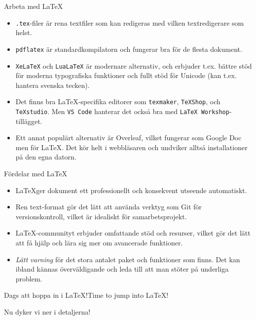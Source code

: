 \begin{Slide}{Arbeta med \LaTeX}\SlideFontSmall
  \begin{itemize}
    \item \texttt{.tex}-filer är rena textfiler som kan redigeras med vilken textredigerare som helst.
    \item \texttt{pdflatex} är standardkompilatorn och fungerar bra för de flesta dokument.
    \item \texttt{XeLaTeX} och \texttt{LuaLaTeX} är modernare alternativ, och erbjuder t.ex. bättre stöd för moderna typografiska funktioner och fullt stöd för Unicode (kan t.ex. hantera svenska tecken).
    \item Det finns bra \LaTeX -specifika editorer som \texttt{texmaker}, \texttt{TeXShop}, och \texttt{TeXstudio}. Men \texttt{VS Code} hanterar det också bra med \texttt{LaTeX Workshop}-tillägget.
    \item Ett annat populärt alternativ är Overleaf, vilket fungerar som Google Doc men för \LaTeX. Det kör helt i webbläsaren och undviker alltså installationer på den egna datorn.
  \end{itemize}
\end{Slide}


\begin{Slide}{Fördelar med \LaTeX}\SlideFontSmall
  \begin{itemize}
    \item \LaTeX ger dokument ett professionellt och konsekvent utseende automatiskt.
    \item Ren text-format gör det lätt att använda verktyg som Git för versionskontroll, vilket är idealiskt för samarbetsprojekt.
    \item \LaTeX-communityt erbjuder omfattande stöd och resurser, vilket gör det lätt att få hjälp och lära sig mer om avancerade funktioner.
    \item \emph{Lätt varning} för det stora antalet paket och funktioner som finns. Det kan ibland kännas överväldigande och leda till att man stöter på underliga problem.
  \end{itemize}
\end{Slide}


\begin{Slide}{\ifswedish Dags att hoppa in i \LaTeX!\else Time to jump into \LaTeX!\fi}

  \begin{center}
    \Huge Nu dyker vi ner i detaljerna!
  \end{center}
\end{Slide}

